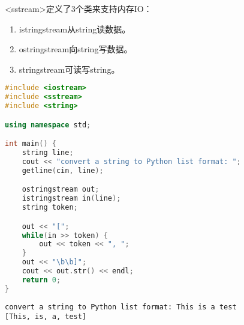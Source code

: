 <sstream>定义了3个类来支持内存IO：

\begin{enumerate}
	\item istringstream从string读数据。
	\item ostringstream向string写数据。
	\item stringstream可读写string。
\end{enumerate}


\begin{lstlisting}[language=C++]
#include <iostream>
#include <sstream>
#include <string>

using namespace std;

int main() {
    string line;
    cout << "convert a string to Python list format: ";
    getline(cin, line);

    ostringstream out;
    istringstream in(line);
    string token;

    out << "[";
    while(in >> token) {
        out << token << ", ";
    }
    out << "\b\b]";
    cout << out.str() << endl;
    return 0;
}
\end{lstlisting}

\begin{tcolorbox}
	\begin{verbatim}
convert a string to Python list format: This is a test
[This, is, a, test]
	\end{verbatim}
\end{tcolorbox}

\newpage
